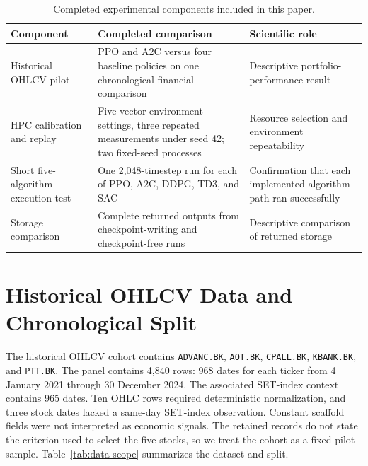 \documentclass[12pt,a4paper,oneside]{book}
\theoremstyle{plain}
\numberwithin{equation}{chapter} \DeclareMathOperator{\Var}{Var}
\begin{document}
\begin{table}[H]
\centering
\small
\caption{Completed experimental components included in this paper.}
\label{tab:study-components}
\begin{tabularx}{\textwidth}{@{}L{0.23\textwidth}L{0.31\textwidth}Y@{}}
\toprule
Component & Completed comparison & Scientific role \\
\midrule
Historical OHLCV pilot & PPO and A2C versus four baseline policies on one chronological financial comparison & Descriptive portfolio-performance result \\
HPC calibration and replay & Five vector-environment settings, three repeated measurements under seed 42; two fixed-seed processes & Resource selection and environment repeatability \\
Short five-algorithm execution test & One 2,048-timestep run for each of PPO, A2C, DDPG, TD3, and SAC & Confirmation that each implemented algorithm path ran successfully \\
Storage comparison & Complete returned outputs from checkpoint-writing and checkpoint-free runs & Descriptive comparison of returned storage \\
\bottomrule
\end{tabularx}
\end{table}

\section{Historical OHLCV Data and Chronological Split}

The historical OHLCV cohort contains \texttt{ADVANC.BK}, \texttt{AOT.BK}, \texttt{CPALL.BK}, \texttt{KBANK.BK}, and \texttt{PTT.BK}. The panel contains 4,840 rows: 968 dates for each ticker from 4 January 2021 through 30 December 2024. The associated SET-index context contains 965 dates. Ten OHLC rows required deterministic normalization, and three stock dates lacked a same-day SET-index observation. Constant scaffold fields were not interpreted as economic signals. The retained records do not state the criterion used to select the five stocks, so we treat the cohort as a fixed pilot sample. Table~\ref{tab:data-scope} summarizes the dataset and split.
\end{document}
